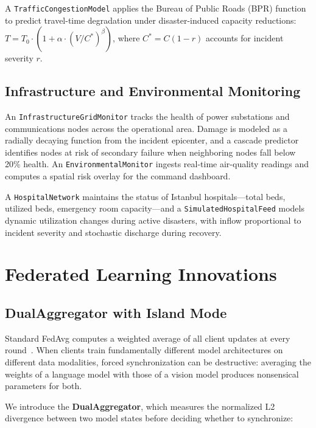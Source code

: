 \documentclass[conference]{IEEEtran}
\begin{document}
A \texttt{TrafficCongestionModel} applies the Bureau of Public Roads (BPR) function to predict travel-time degradation under disaster-induced capacity reductions: $T = T_0 \cdot (1 + \alpha \cdot (V/C^*)^\beta)$, where $C^* = C(1 - r)$ accounts for incident severity $r$.

\subsection{Infrastructure and Environmental Monitoring}

An \texttt{InfrastructureGridMonitor} tracks the health of power substations and communications nodes across the operational area. Damage is modeled as a radially decaying function from the incident epicenter, and a cascade predictor identifies nodes at risk of secondary failure when neighboring nodes fall below 20\% health. An \texttt{EnvironmentalMonitor} ingests real-time air-quality readings and computes a spatial risk overlay for the command dashboard.

A \texttt{HospitalNetwork} maintains the status of Istanbul hospitals---total beds, utilized beds, emergency room capacity---and a \texttt{SimulatedHospitalFeed} models dynamic utilization changes during active disasters, with inflow proportional to incident severity and stochastic discharge during recovery.

\section{Federated Learning Innovations}

\subsection{DualAggregator with Island Mode}

Standard FedAvg computes a weighted average of all client updates at every round~\cite{b3}. When clients train fundamentally different model architectures on different data modalities, forced synchronization can be destructive: averaging the weights of a language model with those of a vision model produces nonsensical parameters for both.

We introduce the \textbf{DualAggregator}, which measures the normalized L2 divergence between two model states before deciding whether to synchronize:
\end{document}
